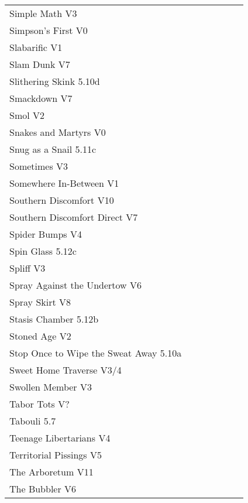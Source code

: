 \begin{flushleft}
\begin{center}
\begin{supertabular}{p{0.76\linewidth}p{0.08\linewidth}}
Simple Math V3 & \pageref{rt:Simple Math} \\
Simpson's First V0 & \pageref{rt:Simpson's First} \\
Slabarific V1 & \pageref{rt:Slabarific} \\
Slam Dunk V7 & \pageref{rt:Slam Dunk} \\
Slithering Skink 5.10d & \pageref{rt:Slithering Skink} \\
Smackdown V7 & \pageref{rt:Smackdown} \\
Smol V2 & \pageref{rt:Smol} \\
Snakes and Martyrs V0 & \pageref{rt:Snakes and Martyrs} \\
Snug as a Snail 5.11c & \pageref{rt:Snug as a Snail} \\
Sometimes V3 & \pageref{rt:Sometimes} \\
Somewhere In-Between V1 & \pageref{rt:Somewhere In-Between} \\
Southern Discomfort V10 & \pageref{rt:Southern Discomfort} \\
Southern Discomfort Direct V7 & \pageref{vr:Southern Discomfort Direct} \\
Spider Bumps V4 & \pageref{rt:Spider Bumps} \\
Spin Glass 5.12c & \pageref{rt:Spin Glass} \\
Spliff V3 & \pageref{rt:Spliff} \\
Spray Against the Undertow V6 & \pageref{vr:Spray Against the Undertow} \\
Spray Skirt V8 & \pageref{rt:Spray Skirt} \\
Stasis Chamber 5.12b & \pageref{rt:Stasis Chamber} \\
Stoned Age V2 & \pageref{rt:Stoned Age} \\
Stop Once to Wipe the Sweat Away 5.10a & \pageref{rt:Stop Once to Wipe the Sweat Away} \\
Sweet Home Traverse V3/4 & \pageref{vr:Sweet Home Traverse} \\
Swollen Member V3 & \pageref{rt:Swollen Member} \\
Tabor Tots V? & \pageref{vr:Tabor Tots} \\
Tabouli 5.7 & \pageref{rt:Tabouli} \\
Teenage Libertarians V4 & \pageref{rt:Teenage Libertarians} \\
Territorial Pissings V5 & \pageref{rt:Territorial Pissings} \\
The Arboretum V11 & \pageref{rt:The Arboretum} \\
The Bubbler V6 & \pageref{rt:The Bubbler} \\

\end{supertabular}
\end{center}
\end{flushleft}
